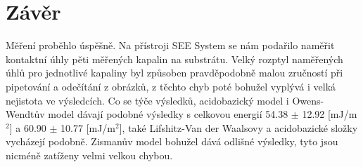 \documentclass[12pt]{article}
\begin{document}
\newpage
\section{Závěr}
Měření proběhlo úspěšně. Na přístroji SEE System se nám podařilo naměřit kontaktní úhly pěti měřených kapalin na substrátu. Velký rozptyl naměřených úhlů pro jednotlivé kapaliny byl způsoben pravděpodobně malou zručností při pipetování a odečítání z obrázků, z těchto chyb poté bohužel vyplývá i velká nejistota ve výsledcích. Co se týče výsledků, acidobazický model i Owens-Wendtův model dávají podobné výsledky s celkovou energií 54.38 $\pm$ 12.92 [mJ/m$^2$] a 60.90 $\pm$ 10.77 [mJ/m$^2$], také Lifshitz-Van der Waalsovy a acidobazické složky vycházejí podobně. Zismanův model bohužel dává odlišné výsledky, tyto jsou nicméně zatíženy velmi velkou chybou.
\end{document}
